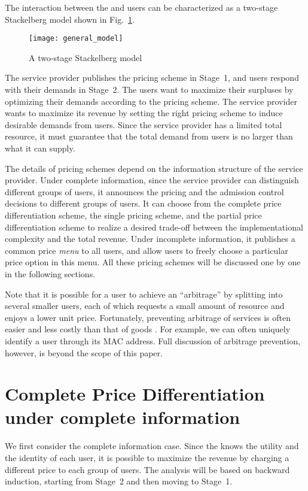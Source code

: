 \documentclass[twocolumn,10pt,twosided]{IEEEtran}
\begin{document}
The interaction between the  and users can be characterized as a two-stage Stackelberg model shown in Fig.~\ref{fig:model}.
\begin{figure}[ht]
\centering
\texttt{[image: general\_model]}
\caption{A two-stage Stackelberg model} \label{fig:model}
\end{figure}
The service provider publishes the pricing scheme in Stage~1, and users respond with their demands in Stage~2. The users want to maximize their surpluses by optimizing their demands according to the pricing scheme. The service provider wants to maximize its revenue by setting the right pricing scheme to induce desirable demands from users. Since the service provider has a limited total resource, it must guarantee that the total demand from users is no larger than what it can supply.

The details of pricing schemes depend on the information structure of the service provider. Under complete information, since the service provider can distinguish different groups of users, it announces the pricing and the admission control decisions to different groups of users. It can choose from the complete price differentiation scheme, the single pricing scheme, and the partial price differentiation scheme to realize a desired trade-off between the implementational complexity and the total revenue. Under incomplete information, it publishes a common price \emph{menu} to all users, and allow users to freely choose a particular price option in this menu. All these pricing schemes will be discussed one by one in the following sections.

Note that it is possible for a user to achieve an ``arbitrage'' by splitting into several smaller users, each of which requests a small amount of resource and enjoys a lower unit price. Fortunately, preventing arbitrage of services is often easier and less costly than that of goods \cite{pashigian1995price}. For example, we can often uniquely  identify a user through its MAC address. Full discussion of arbitrage prevention, however, is beyond the scope of this paper.

\section{Complete Price Differentiation under complete information}
\label{sec:cpd}
We first consider the complete information case. Since the  knows the utility and the identity of each user, it is possible to maximize the revenue by charging a different price to each group of users. The analysis will be based on backward induction, starting from Stage~2 and then moving to Stage~1.
\end{document}
